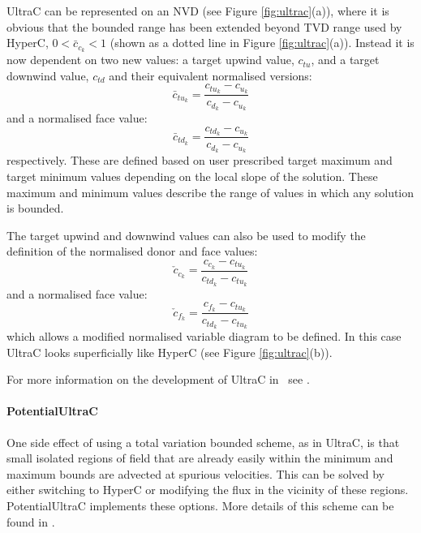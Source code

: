 UltraC can be represented on an NVD (see Figure \ref{fig:ultrac}(a)), where it is obvious that the bounded range has been extended beyond TVD range used by HyperC, $0<\bar{c}_{c_k}<1$ (shown as a dotted line in Figure \ref{fig:ultrac}(a)).  Instead it is now dependent on two new values: a target upwind value, $c_{tu}$, and a target downwind value, $c_{td}$ and their equivalent normalised versions:
\begin{equation}
\bar{c}_{tu_k} = \frac{c_{tu_k}-c_{u_k}}{c_{d_k}-c_{u_k}}
\end{equation}
and a normalised face value:
\begin{equation}
\bar{c}_{td_k} = \frac{c_{td_k}-c_{u_k}}{c_{d_k}-c_{u_k}}
\end{equation}
respectively.  These are defined based on user prescribed target maximum and target minimum values depending on the local slope of the solution.  These maximum and minimum values describe the range of values in which any solution is bounded.

The target upwind and downwind values can also be used to modify the definition of the normalised donor and face values:
\begin{equation}
\check{c}_{c_k} = \frac{c_{c_k}-c_{tu_k}}{c_{td_k}-c_{tu_k}}
\end{equation}
and a normalised face value:
\begin{equation}
\check{c}_{f_k} = \frac{c_{f_k}-c_{tu_k}}{c_{td_k}-c_{tu_k}}
\end{equation}
which allows a modified normalised variable diagram to be defined.  In this case UltraC looks superficially like HyperC (see Figure \ref{fig:ultrac}(b)).

For more information on the development of UltraC in \fluidity\ see \citet{wilson_phdthesis_2009}.

\paragraph{PotentialUltraC} \label{sec:potultrac}

One side effect of using a total variation bounded scheme, as in UltraC, is that small isolated regions of field that are already easily within the minimum and maximum bounds are advected at spurious velocities.  This can be solved by either switching to HyperC or modifying the flux in the vicinity of these regions.  PotentialUltraC implements these options.  More details of this scheme can be found in \citet{wilson_phdthesis_2009}.

